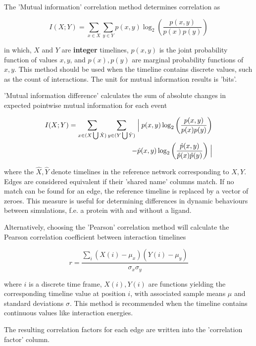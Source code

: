 The 'Mutual information' correlation method determines correlation as 

\begin{equation}
I(X;Y) = \sum_{x \in X} \sum_{y \in Y} p(x,y) \log_2 \left(\frac{p(x,y)}{p(x)p(y)}\right) 
\end{equation}

in which, $X$ and $Y$ are \textbf{integer} timelines, $p(x,y)$ is the joint probability function of values $x,y$, and $p(x),p(y)$ are marginal probability functions of $x,y$. This method should be used when the timeline contains discrete values, such as the count of interactions. The unit for mutual information results is 'bits'.

'Mutual information difference' calculates the sum of absolute changes in expected pointwise mutual information for each event

\begin{equation}
\begin{split}
  I(X;Y) = \sum_{x \in (X \bigcup \hat{X})} \sum_{y \in (Y \bigcup \hat{Y})} \Bigm| p(x,y) \log_2{\left(\frac{p(x,y)}{p(x)p(y)}\right)} \\
  - \hat{p}(x,y) \log_2{\left(\frac{\hat{p}(x,y)}{\hat{p}(x)\hat{p}(y)} \right)} \Bigm| 
\end{split}
\end{equation}

where the $\hat{X},\hat{Y}$ denote timelines in the reference network corresponding to $X,Y$. Edges are considered equivalent if their 'shared name' columns match. If no match can be found for an edge, the reference timeline is replaced by a vector of zeroes. This measure is useful for determining differences in dynamic behaviours between simulations, f.e. a protein with and without a ligand. 

Alternatively, choosing the 'Pearson' correlation method will calculate the Pearson correlation coefficient between interaction timelines

\begin{equation}
  r = \frac{\sum_{i} (X(i) - \mu_x)(Y(i) - \mu_y)}{\sigma_x \sigma_y}
 \end{equation}

where $i$ is a discrete time frame, $X(i),Y(i)$ are functions yielding the corresponding timeline value at position $i$, with associated sample means $\mu$ and standard deviations $\sigma$. This method is recommended when the timeline contains continuous values like interaction energies. 

The resulting correlation factors for each edge are written into the 'correlation factor' column.


